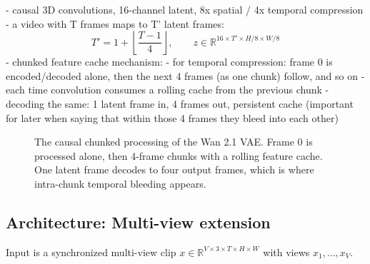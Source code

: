 - causal 3D convolutions, 16-channel latent, 8x spatial / 4x temporal compression
- a video with T frames maps to T' latent frames:
\begin{equation}
T' = 1 + \left\lfloor \frac{T-1}{4} \right\rfloor,
\qquad
z \in \mathbb{R}^{16 \times T' \times H/8 \times W/8}
\label{eq:wan_latent}
\end{equation}
- chunked feature cache mechanism:
    - for temporal compression: frame 0 is encoded/decoded alone, then the next 4 frames (as one chunk) follow, and so on
    - each time convolution consumes a rolling cache from the previous chunk
    - decoding the same: 1 latent frame in, 4 frames out, persistent cache
    (important for later when saying that within those 4 frames they bleed into each other)

\begin{figure}[t]
\centering
{}
\caption{The causal chunked processing of the Wan 2.1 VAE. Frame 0 is processed alone, then 4-frame chunks with a rolling feature cache. One latent frame decodes to four output frames, which is where intra-chunk temporal bleeding appears.}
\label{fig:chunking}
\end{figure}

\subsection{Architecture: Multi-view extension}

Input is a synchronized multi-view clip $x \in \mathbb{R}^{V \times 3 \times T \times H \times W}$ with views $x_1, \dots, x_V$.


